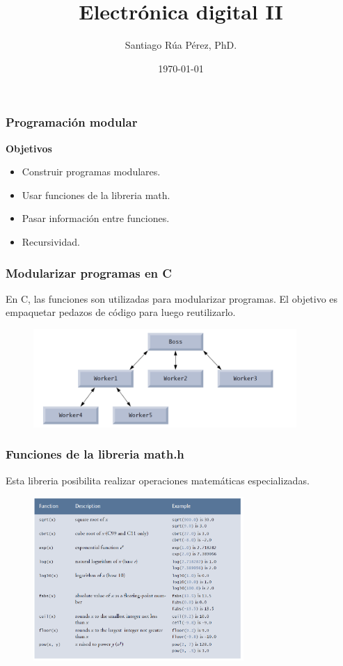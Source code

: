 \documentclass[10.5pt,scale=1.0,t,aspectratio=169,hyperref={pdfpagelabels=false}]{beamer}
\title{Electrónica digital II}
\author{Santiago Rúa Pérez, PhD.}
\date{\today}
\begin{document}
	\begin{frame}
		\titlepage
	\end{frame}
	\frame{
		\begin{center}
			\LARGE \textcolor{blue}{FUNCIONES Y LIBRERIAS EN C}
		\end{center}
		
	}

\begin{frame}
	\frametitle{Programaci\'on modular}
	{\bf Objetivos}
	\begin{itemize}
	\item Construir programas modulares.
	\item Usar funciones de la libreria math.
	\item Pasar información entre funciones.
	\item Recursividad.
	\end{itemize}
\end{frame}
\begin{frame}
\frametitle{Modularizar programas en C}
	En C, las funciones son utilizadas para modularizar programas. El objetivo es empaquetar pedazos de código para luego reutilizarlo.
	\begin{figure}
		\centering
		\includegraphics[width=10cm]{FuncionesModularidad}
	\end{figure}
\end{frame}

\begin{frame}
	\frametitle{Funciones de la libreria math.h}
	Esta libreria posibilita realizar operaciones matemáticas especializadas.
	\begin{figure}
		\centering
		\includegraphics[width=8cm]{MathLibrary}
	\end{figure}
	
\end{frame}
\end{document}
